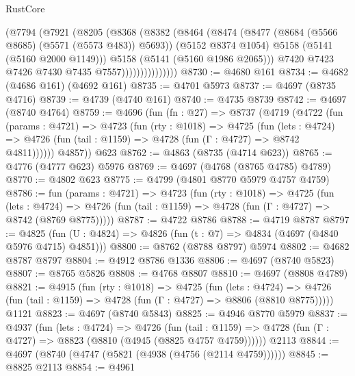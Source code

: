 \begin{lexlean}{RustCore}
\begin{coremodule}
                        (@7794
                          (@7921
                            (@8205
                              (@8368
                                (@8382
                                  (@8464
                                    (@8474
                                      (@8477 (@8684 (@5566 @8685) (@5571 (@5573 @483)) @5693))
                                      (@5152 @8374 @1054)
                                      @5158
                                      (@5141 (@5160 @2000 @1149)))
                                    @5158
                                    (@5141 (@5160 @1986 @2065)))
                                  @7420
                                  @7423
                                  @7426
                                  @7430
                                  @7435
                                  @7557)))))))))))))))
@8730 := @4680 @161
@8734 := @4682 (@4686 @161) (@4692 @161)
@8735 := @4701 @5973
@8737 := @4697 (@8735 @4716)
@8739 := @4739 (@4740 @161)
@8740 := @4735 @8739
@8742 := @4697 (@8740 @4764)
@8759 := @4696
    (fun (fn : @27) =>
    @8737
      (@4719
        (@4722
          (fun (params : @4721) =>
          @4723
            (fun (rty : @1018) =>
            @4725
              (fun (lets : @4724) =>
              @4726 (fun (tail : @1159) => @4728 (fun (Γ : @4727) => @8742 @4811))))))
        @4857))
    @623
@8762 := @4863 (@8735 (@4714 @623))
@8765 := @4776 (@4777 @623) @5976
@8769 := @4697 (@4768 (@8765 @4785) @4789)
@8770 := @4802 @623
@8775 := @4799 (@4801 @8770 @5979 @4757 @4759)
@8786 := fun (params : @4721) =>
  @4723
    (fun (rty : @1018) =>
    @4725
      (fun (lets : @4724) =>
      @4726 (fun (tail : @1159) => @4728 (fun (Γ : @4727) => @8742 (@8769 @8775)))))
@8787 := @4722 @8786
@8788 := @4719 @8787
@8797 := @4825 (fun (U : @4824) => @4826 (fun (t : @7) => @4834 (@4697 (@4840 @5976 @4715) @4851)))
@8800 := @8762 (@8788 @8797) @5974
@8802 := @4682 @8787 @8797
@8804 := @4912 @8786 @1336
@8806 := @4697 (@8740 @5823)
@8807 := @8765 @5826
@8808 := @4768 @8807
@8810 := @4697 (@8808 @4789)
@8821 := @4915
    (fun (rty : @1018) =>
    @4725
      (fun (lets : @4724) =>
      @4726 (fun (tail : @1159) => @4728 (fun (Γ : @4727) => @8806 (@8810 @8775)))))
    @1121
@8823 := @4697 (@8740 @5843)
@8825 := @4946 @8770 @5979
@8837 := @4937
    (fun (lets : @4724) =>
    @4726
      (fun (tail : @1159) => @4728 (fun (Γ : @4727) => @8823 (@8810 (@4945 (@8825 @4757 @4759))))))
    @2113
@8844 := @4697 (@8740 (@4747 (@5821 (@4938 (@4756 (@2114 @4759))))))
@8845 := @8825 @2113
@8854 := @4961

\end{coremodule}
\end{lexlean}
